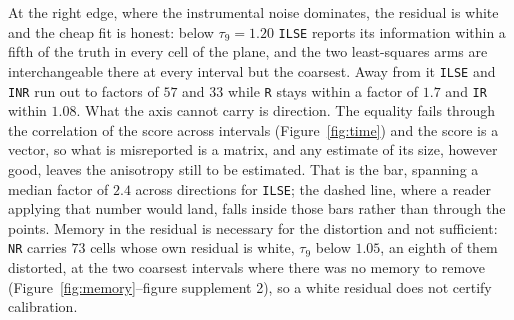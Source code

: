 At the right edge, where the instrumental noise dominates, the residual is white and the cheap fit
is honest: below $\tau_{9} = 1.20$ \texttt{ILSE} reports its information within a fifth of
the truth in every cell of the plane, and the two least-squares arms are interchangeable there at every
interval but the coarsest.
Away from it \texttt{ILSE} and \texttt{INR} run out to factors of $57$ and $33$ while \texttt{R}
stays within a factor of $1.7$ and \texttt{IR} within $1.08$. What the axis cannot carry is direction. The
equality fails through the correlation of the score across intervals (Figure~\ref{fig:time}) and
the score is a vector, so what is misreported is a matrix, and any estimate of its size, however
good, leaves the anisotropy still to be estimated. That is the bar, spanning a median factor of
$2.4$ across directions for \texttt{ILSE}; the dashed line, where a reader applying that number
would land, falls inside those bars rather than through the points.
Memory in the residual is necessary for the distortion and not sufficient: \texttt{NR} carries $73$
cells whose own residual is white, $\tau_{9}$ below $1.05$, an eighth of them distorted, at the two
coarsest intervals where there was no memory to remove (Figure~\ref{fig:memory}--figure supplement 2),
so a white residual
does not certify calibration.

